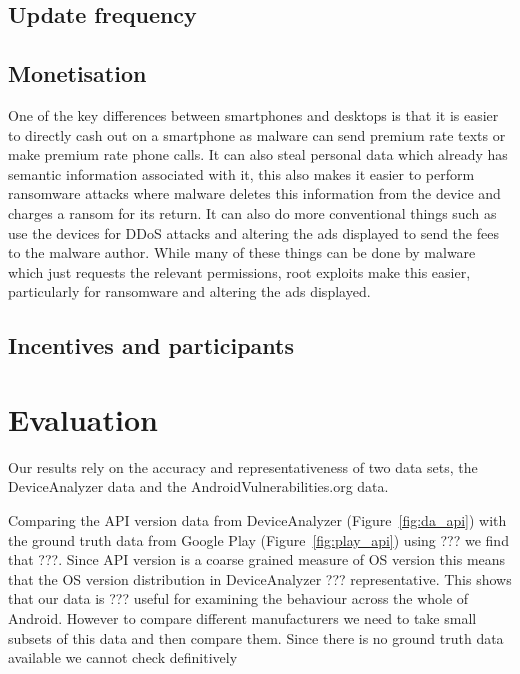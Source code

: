 \documentclass[conference,a4paper,twoside]{IEEEtran}
\begin{document}
\subsection{Update frequency}



\subsection{Monetisation}
One of the key differences between smartphones and desktops is that it is easier to directly cash out on a smartphone as malware can send premium rate texts or make premium rate phone calls.
It can also steal personal data which already has semantic information associated with it, this also makes it easier to perform ransomware attacks where malware deletes this information from the device and charges a ransom for its return.
It can also do more conventional things such as use the devices for DDoS attacks and altering the ads displayed to send the fees to the malware author.
While many of these things can be done by malware which just requests the relevant permissions, root exploits make this easier, particularly for ransomware and altering the ads displayed.

\subsection{Incentives and participants}
\label{sec:economics}
\cite{Felt2011}

\section{Evaluation}
Our results rely on the accuracy and representativeness of two data sets, the DeviceAnalyzer data and the AndroidVulnerabilities.org data.

Comparing the API version data from DeviceAnalyzer (Figure~\ref{fig:da_api}) with the ground truth data from Google Play (Figure~\ref{fig:play_api}) using ??? we find that ???.
Since API version is a coarse grained measure of OS version this means that the OS version distribution in DeviceAnalyzer ??? representative.
This shows that our data is ??? useful for examining the behaviour across the whole of Android.
However to compare different manufacturers we need to take small subsets of this data and then compare them.
Since there is no ground truth data available we cannot check definitively 
\end{document}
